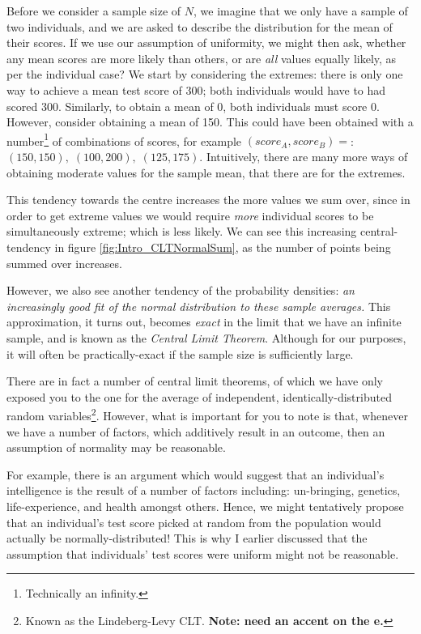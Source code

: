 \documentclass[11pt,fullpage]{book}
\begin{document}
Before we consider a sample size of $N$, we imagine that we only have a sample of two individuals, and we are asked to describe the distribution for the mean of their scores. If we use our assumption of uniformity, we might then ask, whether any mean scores are more likely than others, or are \textit{all} values equally likely, as per the individual case? We start by considering the extremes: there is only one way to achieve a mean test score of 300; both individuals would have to had scored 300. Similarly, to obtain a mean of 0, both individuals must score 0. However, consider obtaining a mean of 150. This could have been obtained with a number\footnote{Technically an infinity.} of combinations of scores, for example $\left(score_A,score_B\right)=$: $\left(150,150\right),\;\left(100,200\right),\;\left(125,175\right)$. Intuitively, there are many more ways of obtaining moderate values for the sample mean, that there are for the extremes. 

This tendency towards the centre increases the more values we sum over, since in order to get extreme values we would require \textit{more} individual scores to be simultaneously extreme; which is less likely. We can see this increasing central-tendency in figure \ref{fig:Intro_CLTNormalSum}, as the number of points being summed over increases.

However, we also see another tendency of the probability densities: \textit{an increasingly good fit of the normal distribution to these sample averages.} This approximation, it turns out, becomes \textit{exact} in the limit that we have an infinite sample, and is known as the \textit{Central Limit Theorem}. Although for our purposes, it will often be practically-exact if the sample size is sufficiently large. 

There are in fact a number of central limit theorems, of which we have only exposed you to the one for the average of independent, identically-distributed random variables\footnote{Known as the Lindeberg-Levy CLT. \textbf{Note: need an accent on the e.}}. However, what is important for you to note is that, whenever we have a number of factors, which additively result in an outcome, then an assumption of normality may be reasonable.

For example, there is an argument which would suggest that an individual's intelligence is the result of a number of factors including: un-bringing, genetics, life-experience, and health amongst others. Hence, we might tentatively propose that an individual's test score picked at random from the population would actually be normally-distributed! This is why I earlier discussed that the assumption that individuals' test scores were uniform might not be reasonable.
\end{document}
